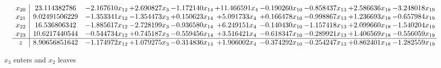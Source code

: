 \documentclass[10pt]{article}
\begin{document}
\[\begin{array}{c| c c@{\hskip 2pt} c@{\hskip 2pt} c@{\hskip 2pt} c@{\hskip 2pt} c@{\hskip 2pt} c@{\hskip 2pt} c@{\hskip 2pt} c@{\hskip 2pt} }
 x_{20}   &  23.114382786 & -2.167610 x_{12} & + 2.690827 x_{3} & -1.172140 x_{14} & + 11.466591 x_{4} & -0.190260 x_{10} & -0.858437 x_{13} & + 2.586636 x_{18} & -3.248018 x_{19}\\
 x_{21}   &  9.02491506229 & -1.353341 x_{12} & -1.354473 x_{3} & + 0.150623 x_{14} & + 5.091733 x_{4} & + 0.166478 x_{10} & -0.998867 x_{13} & + 1.236693 x_{18} & -0.657984 x_{19}\\
 x_{22}   &  16.536806342 & -1.885617 x_{12} & -2.728199 x_{3} & -0.936580 x_{14} & + 6.249151 x_{4} & -0.140430 x_{10} & -1.157418 x_{13} & + 2.099660 x_{18} & -1.540204 x_{19}\\
 x_{23}   &  10.6217440544 & -0.544734 x_{12} & + 0.745187 x_{3} & -0.559456 x_{14} & + 3.516421 x_{4} & -0.618347 x_{10} & -0.289921 x_{13} & + 1.406569 x_{18} & -0.556059 x_{19}\\
\hline
z    &  8.90656851642 & -1.174972 x_{12} & + 1.079275 x_{3} & -0.314836 x_{14} & + 1.906002 x_{4} & -0.374292 x_{10} & -0.254247 x_{13} & + 0.862401 x_{18} & -1.282559 x_{19}\\
\end{array}\]


 $ x_{3} $ enters and $ x_{2} $ leaves 
\end{document}
